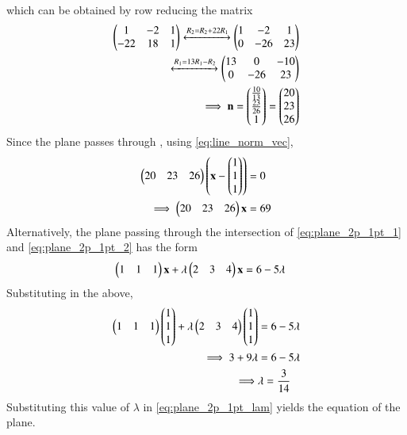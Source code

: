 \begin{enumerate}[label=\arabic*.,ref=\thesubsection.\theenumi]
\begin{align}
\end{align}
%
which can be obtained by row reducing the matrix
\begin{align}
\begin{pmatrix}
1 & -2 & 1
\\
-22 & 18 & 1
\end{pmatrix}
\xleftrightarrow[]{R_2 = R_2+22R_1}
\begin{pmatrix}
1 & -2 & 1
\\
0  & -26 & 23
\end{pmatrix}
\\
\xleftrightarrow[]{R_1 = 13R_1-R_2}
\begin{pmatrix}
13 & 0 & -10
\\
0  & -26 & 23
\end{pmatrix}
\\
\implies \mathbf{n} = \begin{pmatrix}\frac{10}{13}\\\frac{23}{26}\\1\end{pmatrix} = \begin{pmatrix}20\\23\\26\end{pmatrix}
\end{align}
%
Since the plane passes through , using 
 \eqref{eq:line_norm_vec},
%
\begin{align}
\begin{pmatrix}20 & 23 & 26\end{pmatrix}\left(\mathbf{x}- \begin{pmatrix}1\\1\\1\end{pmatrix}\right) &= 0
\\
\implies 
\begin{pmatrix}20 & 23 & 26\end{pmatrix}\mathbf{x} &= 69
\end{align}
%
Alternatively, the plane passing through the intersection of \eqref{eq:plane_2p_1pt_1} and 
\eqref{eq:plane_2p_1pt_2} has the form 
%
\begin{align}
\label{eq:plane_2p_1pt_lam}
\begin{pmatrix}1 & 1 & 1\end{pmatrix}\mathbf{x} + \lambda \begin{pmatrix}2 & 3 & 4\end{pmatrix}\mathbf{x} &=6 -5\lambda  
\end{align}
%
Substituting  in the above, 
%
\begin{align}
\begin{pmatrix}1 & 1 & 1\end{pmatrix}\begin{pmatrix}1\\1\\1\end{pmatrix} + \lambda \begin{pmatrix}2 & 3 & 4\end{pmatrix}\begin{pmatrix}1\\1\\1\end{pmatrix} &=6 -5\lambda  
\\
\implies 3 + 9\lambda &= 6-5\lambda
\\
\implies &\lambda = \frac{3}{14}
\end{align}
%
Substituting this value of $\lambda $ in \eqref{eq:plane_2p_1pt_lam} yields the equation of the plane.


\end{enumerate}
